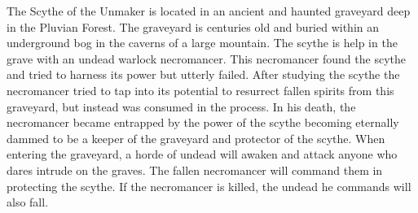 The Scythe of the Unmaker is located in an ancient and haunted graveyard deep in the Pluvian Forest. The graveyard is centuries old and buried within an underground bog in the caverns of a large mountain. The scythe is help in the grave with an undead warlock necromancer. This necromancer found the scythe and tried to harness its power but utterly failed. After studying the scythe the necromancer tried to tap into its potential to resurrect fallen spirits from this graveyard, but instead was consumed in the process. In his death, the necromancer became entrapped by the power of the scythe becoming eternally dammed to be a keeper of the graveyard and protector of the scythe. When entering the graveyard, a horde of undead will awaken and attack anyone who dares intrude on the graves. The fallen necromancer will command them in protecting the scythe. If the necromancer is killed, the undead he commands will also fall.

